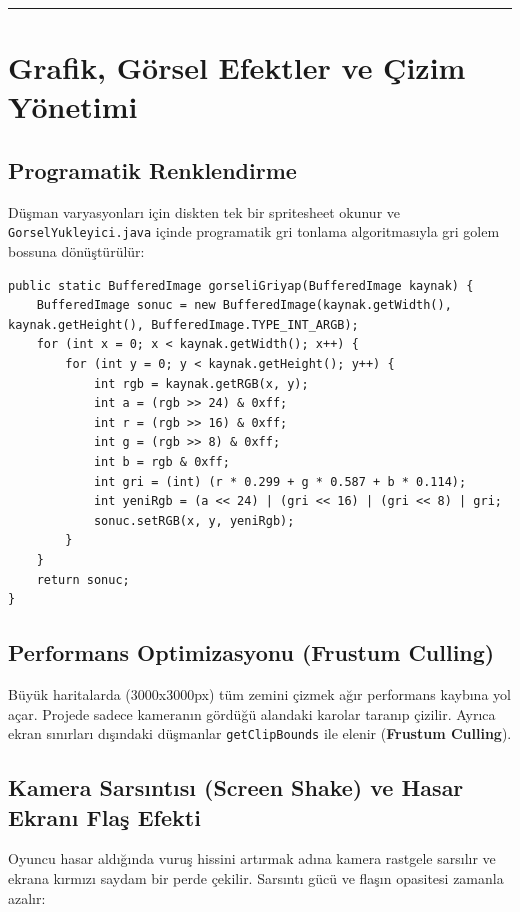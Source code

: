 \documentclass[12pt]{article}
\begin{document}
\bigskip
\hrule
\bigskip

\section{Grafik, Görsel Efektler ve Çizim Yönetimi}

\subsection{Programatik Renklendirme}
Düşman varyasyonları için diskten tek bir spritesheet okunur ve \texttt{GorselYukleyici.java} içinde programatik gri tonlama algoritmasıyla gri golem bossuna dönüştürülür:

\begin{lstlisting}[caption={Programatik Gri Tonlama Filtresi}, label={list:gri}]
public static BufferedImage gorseliGriyap(BufferedImage kaynak) {
    BufferedImage sonuc = new BufferedImage(kaynak.getWidth(), kaynak.getHeight(), BufferedImage.TYPE_INT_ARGB);
    for (int x = 0; x < kaynak.getWidth(); x++) {
        for (int y = 0; y < kaynak.getHeight(); y++) {
            int rgb = kaynak.getRGB(x, y);
            int a = (rgb >> 24) & 0xff;
            int r = (rgb >> 16) & 0xff;
            int g = (rgb >> 8) & 0xff;
            int b = rgb & 0xff;
            int gri = (int) (r * 0.299 + g * 0.587 + b * 0.114);
            int yeniRgb = (a << 24) | (gri << 16) | (gri << 8) | gri;
            sonuc.setRGB(x, y, yeniRgb);
        }
    }
    return sonuc;
}
\end{lstlisting}

\subsection{Performans Optimizasyonu (Frustum Culling)}
Büyük haritalarda (3000x3000px) tüm zemini çizmek ağır performans kaybına yol açar. Projede sadece kameranın gördüğü alandaki karolar taranıp çizilir. Ayrıca ekran sınırları dışındaki düşmanlar \texttt{getClipBounds} ile elenir (\textbf{Frustum Culling}).

\subsection{Kamera Sarsıntısı (Screen Shake) ve Hasar Ekranı Flaş Efekti}
Oyuncu hasar aldığında vuruş hissini artırmak adına kamera rastgele sarsılır ve ekrana kırmızı saydam bir perde çekilir. Sarsıntı gücü ve flaşın opasitesi zamanla azalır:
\end{document}
